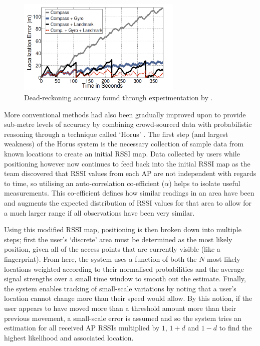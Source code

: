 \documentclass{UoYCSproject}
\begin{document}
                \begin{figure}[h]
                    \label{fig:dead}
                    \centering
                    \includegraphics[width=0.7\textwidth]{dead.png}
                    \caption{Dead-reckoning accuracy found through experimentation by \citet{wang2012no}.}
                \end{figure}
                
                More conventional methods had also been gradually improved upon to provide sub-metre levels of accuracy by combining crowd-sourced data with probabilistic reasoning through a technique called `Horus' \citep{youssef2005horus}. The first step (and largest weakness) of the Horus system is the necessary collection of sample data from known locations to create an initial RSSI map. Data collected by users while positioning however now continues to feed back into the initial RSSI map as the team discovered that RSSI values from each AP are not independent with regards to time, so utilising an auto-correlation co-efficient ($\alpha$) helps to isolate useful measurements. This co-efficient defines how similar readings in an area have been and augments the expected distribution of RSSI values for that area to allow for a much larger range if all observations have been very similar.
                
                Using this modified RSSI map, positioning is then broken down into multiple steps; first the user's `discrete' area must be determined as the most likely position, given all of the access points that are currently visible (like a fingerprint). From here, the system uses a function of both the $N$ most likely locations weighted according to their normalised probabilities and the average signal strengths over a small time window to smooth out the estimate. Finally, the system enables tracking of small-scale variations by noting that a user's location cannot change more than their speed would allow. By this notion, if the user appears to have moved more than a threshold amount more than their previous movement, a small-scale error is assumed and so the system tries an estimation for all received AP RSSIs multiplied by $1$, $1+d$ and $1-d$ to find the highest likelihood and associated location.
                
\end{document}
